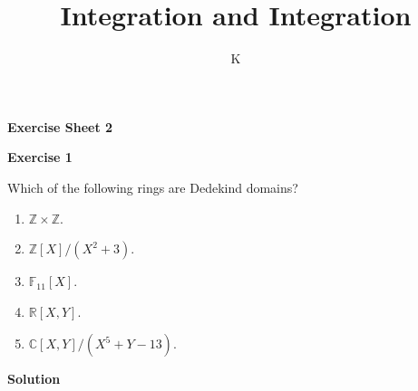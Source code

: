 \documentclass[a4paper]{article}
\title{Integration and Integration}
\author{K}
\theoremstyle{definition}
\begin{document}
\begin{center}
    \noindent\textbf{Exercise Sheet 2}
\end{center}
\noindent\textbf{Exercise 1}

\noindent Which of the following rings are Dedekind domains?

\begin{enumerate}
    \item \(\mathbb{Z} \times \mathbb{Z}\).
    \item \(\mathbb{Z}[X] / (X^2 + 3)\).
    \item \(\mathbb{F}_{11}[X]\).
    \item \(\mathbb{R}[X, Y]\).
    \item \(\mathbb{C}[X, Y] / (X^5 + Y - 13)\).
\end{enumerate}

\noindent\textbf{Solution}
\end{document}
